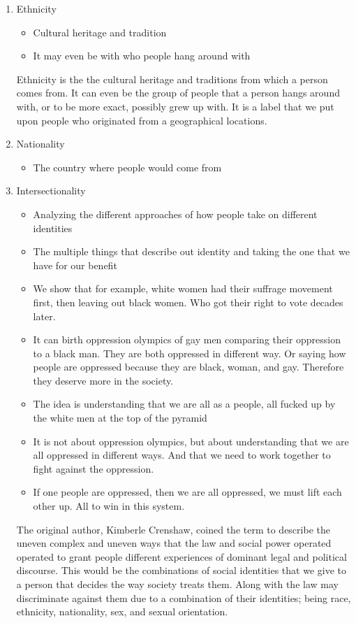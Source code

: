 \documentclass{article}
\begin{document}
\begin{enumerate}
  \item Ethnicity
    \begin{itemize}
      \item Cultural heritage and tradition
      \item It may even be with who people hang around with
    \end{itemize}
    Ethnicity is the the cultural heritage and traditions
    from which a person comes from.
    It can even be the group of people
    that a person hangs around with,
    or to be more exact, possibly
    grew up with. It is a label
    that we put upon people who
    originated from a geographical locations.
  \item Nationality
    \begin{itemize}
      \item The country where people would come from
    \end{itemize}
  \item Intersectionality
    \begin{itemize}
      \item Analyzing the different approaches
        of how people take on different identities
      \item The multiple things that describe
        out identity and taking the one that we have
        for our benefit
      \item We show that for example, white women had their
        suffrage movement first,
        then leaving out black women. Who
        got their right to vote decades later.
      \item It can birth oppression olympics of gay men comparing their 
        oppression to a black man. They are both oppressed in different
        way.
        Or saying how people are oppressed because they are
        black, woman, and gay. 
        Therefore they deserve more in the society.
      \item The idea is understanding that we are all as a people, all
        fucked up by the white men at the top of the 
        pyramid
      \item It is not about oppression olympics, but about
        understanding that we are all oppressed in different ways.
        And that we need to work together to fight against the 
        oppression.
      \item If one people are oppressed, then we are all oppressed,
        we must lift each other up.
        All to win in this system.
    \end{itemize}
    The original author, Kimberle Crenshaw, coined the term
    to describe the uneven complex and uneven ways that the law
    and social power operated operated to grant people
    different experiences of dominant legal and political discourse.
    This would be the combinations of social
    identities that we give to a person that decides
    the way society treats them. Along with the law
    may discriminate against them due to a combination
    of their identities; being race, ethnicity, nationality, sex, and sexual orientation.

\end{enumerate}
\end{document}
